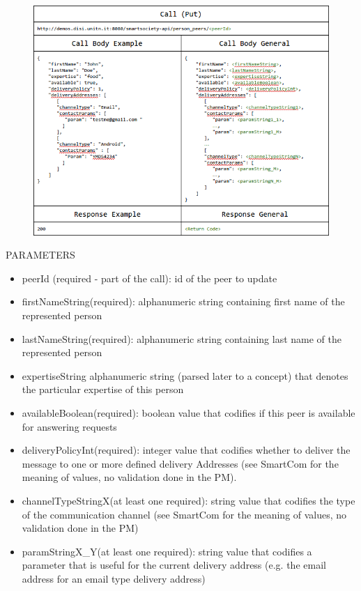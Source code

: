\begin{figure}[htb!]
\centering
\includegraphics[width=1\linewidth]{figures/abs-update-peer.png}
\label{fig:abs-update-peer}
\end{figure}

PARAMETERS
\begin{itemize}
	\item peerId (required - part of the call): id of the peer to update
	\item firstNameString(required): alphanumeric string containing first name of the represented person 
	\item lastNameString(required): alphanumeric string containing last name of the represented person
	\item expertiseString alphanumeric string (parsed later to a concept) that denotes the particular expertise of this person
	\item availableBoolean(required): boolean value that codifies if this peer is available for answering requests
	\item deliveryPolicyInt(required): integer value that codifies whether to deliver the message to one or more defined delivery Addresses (see SmartCom for the meaning of values, no validation done in the PM).
	\item channelTypeStringX(at least one required): string value that codifies the type of the communication channel  (see SmartCom for the meaning of values, no validation done in the PM)
	\item paramStringX\_Y(at least one required): string value that codifies a parameter that is useful for the current delivery address (e.g. the email address for an email type delivery address)
\end{itemize}

